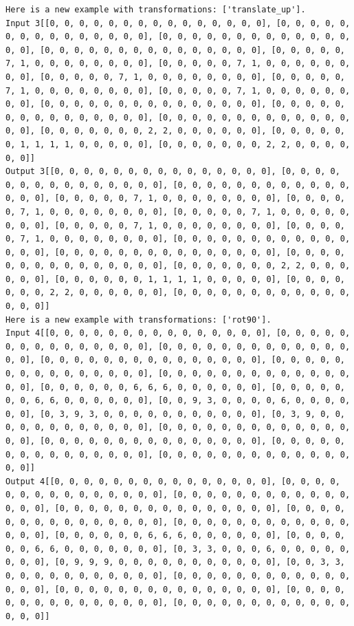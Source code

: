 \begin{lstlisting}
Here is a new example with transformations: ['translate_up'].
Input 3[[0, 0, 0, 0, 0, 0, 0, 0, 0, 0, 0, 0, 0, 0, 0], [0, 0, 0, 0, 0, 0, 0, 0, 0, 0, 0, 0, 0, 0, 0], [0, 0, 0, 0, 0, 0, 0, 0, 0, 0, 0, 0, 0, 0, 0], [0, 0, 0, 0, 0, 0, 0, 0, 0, 0, 0, 0, 0, 0, 0], [0, 0, 0, 0, 0, 7, 1, 0, 0, 0, 0, 0, 0, 0, 0], [0, 0, 0, 0, 0, 7, 1, 0, 0, 0, 0, 0, 0, 0, 0], [0, 0, 0, 0, 0, 7, 1, 0, 0, 0, 0, 0, 0, 0, 0], [0, 0, 0, 0, 0, 7, 1, 0, 0, 0, 0, 0, 0, 0, 0], [0, 0, 0, 0, 0, 7, 1, 0, 0, 0, 0, 0, 0, 0, 0], [0, 0, 0, 0, 0, 0, 0, 0, 0, 0, 0, 0, 0, 0, 0], [0, 0, 0, 0, 0, 0, 0, 0, 0, 0, 0, 0, 0, 0, 0], [0, 0, 0, 0, 0, 0, 0, 0, 0, 0, 0, 0, 0, 0, 0], [0, 0, 0, 0, 0, 0, 0, 2, 2, 0, 0, 0, 0, 0, 0], [0, 0, 0, 0, 0, 0, 1, 1, 1, 1, 0, 0, 0, 0, 0], [0, 0, 0, 0, 0, 0, 0, 2, 2, 0, 0, 0, 0, 0, 0]]
Output 3[[0, 0, 0, 0, 0, 0, 0, 0, 0, 0, 0, 0, 0, 0, 0], [0, 0, 0, 0, 0, 0, 0, 0, 0, 0, 0, 0, 0, 0, 0], [0, 0, 0, 0, 0, 0, 0, 0, 0, 0, 0, 0, 0, 0, 0], [0, 0, 0, 0, 0, 7, 1, 0, 0, 0, 0, 0, 0, 0, 0], [0, 0, 0, 0, 0, 7, 1, 0, 0, 0, 0, 0, 0, 0, 0], [0, 0, 0, 0, 0, 7, 1, 0, 0, 0, 0, 0, 0, 0, 0], [0, 0, 0, 0, 0, 7, 1, 0, 0, 0, 0, 0, 0, 0, 0], [0, 0, 0, 0, 0, 7, 1, 0, 0, 0, 0, 0, 0, 0, 0], [0, 0, 0, 0, 0, 0, 0, 0, 0, 0, 0, 0, 0, 0, 0], [0, 0, 0, 0, 0, 0, 0, 0, 0, 0, 0, 0, 0, 0, 0], [0, 0, 0, 0, 0, 0, 0, 0, 0, 0, 0, 0, 0, 0, 0], [0, 0, 0, 0, 0, 0, 0, 2, 2, 0, 0, 0, 0, 0, 0], [0, 0, 0, 0, 0, 0, 1, 1, 1, 1, 0, 0, 0, 0, 0], [0, 0, 0, 0, 0, 0, 0, 2, 2, 0, 0, 0, 0, 0, 0], [0, 0, 0, 0, 0, 0, 0, 0, 0, 0, 0, 0, 0, 0, 0]]
Here is a new example with transformations: ['rot90'].
Input 4[[0, 0, 0, 0, 0, 0, 0, 0, 0, 0, 0, 0, 0, 0, 0], [0, 0, 0, 0, 0, 0, 0, 0, 0, 0, 0, 0, 0, 0, 0], [0, 0, 0, 0, 0, 0, 0, 0, 0, 0, 0, 0, 0, 0, 0], [0, 0, 0, 0, 0, 0, 0, 0, 0, 0, 0, 0, 0, 0, 0], [0, 0, 0, 0, 0, 0, 0, 0, 0, 0, 0, 0, 0, 0, 0], [0, 0, 0, 0, 0, 0, 0, 0, 0, 0, 0, 0, 0, 0, 0], [0, 0, 0, 0, 0, 0, 6, 6, 6, 0, 0, 0, 0, 0, 0], [0, 0, 0, 0, 0, 0, 0, 6, 6, 0, 0, 0, 0, 0, 0], [0, 0, 9, 3, 0, 0, 0, 0, 6, 0, 0, 0, 0, 0, 0], [0, 3, 9, 3, 0, 0, 0, 0, 0, 0, 0, 0, 0, 0, 0], [0, 3, 9, 0, 0, 0, 0, 0, 0, 0, 0, 0, 0, 0, 0], [0, 0, 0, 0, 0, 0, 0, 0, 0, 0, 0, 0, 0, 0, 0], [0, 0, 0, 0, 0, 0, 0, 0, 0, 0, 0, 0, 0, 0, 0], [0, 0, 0, 0, 0, 0, 0, 0, 0, 0, 0, 0, 0, 0, 0], [0, 0, 0, 0, 0, 0, 0, 0, 0, 0, 0, 0, 0, 0, 0]]
Output 4[[0, 0, 0, 0, 0, 0, 0, 0, 0, 0, 0, 0, 0, 0, 0], [0, 0, 0, 0, 0, 0, 0, 0, 0, 0, 0, 0, 0, 0, 0], [0, 0, 0, 0, 0, 0, 0, 0, 0, 0, 0, 0, 0, 0, 0], [0, 0, 0, 0, 0, 0, 0, 0, 0, 0, 0, 0, 0, 0, 0], [0, 0, 0, 0, 0, 0, 0, 0, 0, 0, 0, 0, 0, 0, 0], [0, 0, 0, 0, 0, 0, 0, 0, 0, 0, 0, 0, 0, 0, 0], [0, 0, 0, 0, 0, 0, 6, 6, 6, 0, 0, 0, 0, 0, 0], [0, 0, 0, 0, 0, 0, 6, 6, 0, 0, 0, 0, 0, 0, 0], [0, 3, 3, 0, 0, 0, 6, 0, 0, 0, 0, 0, 0, 0, 0], [0, 9, 9, 9, 0, 0, 0, 0, 0, 0, 0, 0, 0, 0, 0], [0, 0, 3, 3, 0, 0, 0, 0, 0, 0, 0, 0, 0, 0, 0], [0, 0, 0, 0, 0, 0, 0, 0, 0, 0, 0, 0, 0, 0, 0], [0, 0, 0, 0, 0, 0, 0, 0, 0, 0, 0, 0, 0, 0, 0], [0, 0, 0, 0, 0, 0, 0, 0, 0, 0, 0, 0, 0, 0, 0], [0, 0, 0, 0, 0, 0, 0, 0, 0, 0, 0, 0, 0, 0, 0]]

\end{lstlisting}
